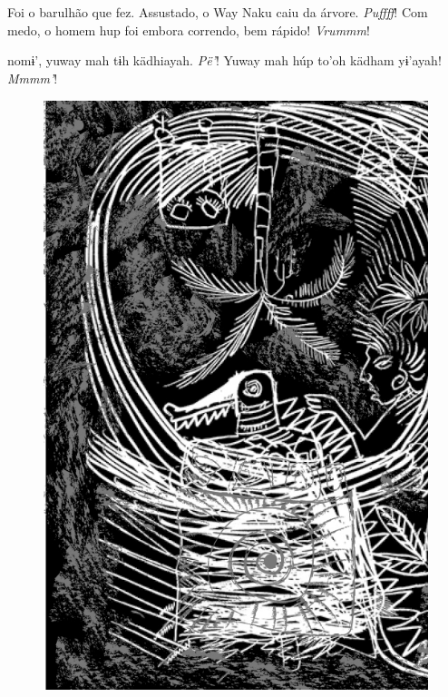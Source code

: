 \chapter*{}

\mbox{}\vspace*{\fill}

 Foi o barulhão
que fez. Assustado,
o Way Naku caiu da
árvore. \textit{Puffff}!
Com medo, o homem
hup foi embora
correndo, bem
rápido! \textit{Vrummm}!

\vspace{2em}

 nomɨ’, yuway
mah tɨh kädhiayah.
\textit{Pë’}! Yuway mah
húp to’oh kädham
yɨ’ayah! \textit{Mmmm’}!

\vspace*{\fill}

\begin{figure}
\vspace*{-1.5cm}
\hspace*{-2.4cm}\includegraphics[width=142mm]{./imgs/img6.jpg}
\end{figure}

